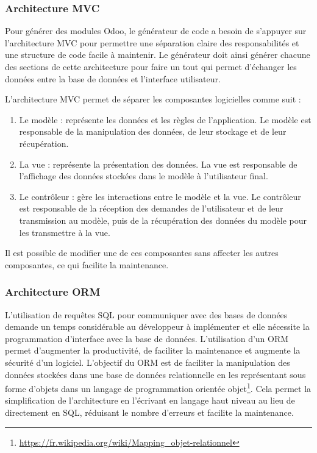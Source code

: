 
\subsubsection{Architecture MVC}

Pour générer des modules Odoo, le générateur de code a besoin de s'appuyer sur l'architecture MVC pour permettre une séparation claire des responsabilités et une structure de code facile à maintenir. Le générateur doit ainsi générer chacune des sections de cette architecture pour faire un tout qui permet d'échanger les données entre la base de données et l'interface utilisateur.

L’architecture MVC permet de séparer les composantes logicielles comme suit : 
\begin{enumerate}
    \item Le modèle : représente les données et les règles de l’application. Le modèle est responsable de la manipulation des données, de leur stockage et de leur récupération.
    \item La vue : représente la présentation des données. La vue est responsable de l’affichage des données stockées dans le modèle à l’utilisateur final.
    \item Le contrôleur : gère les interactions entre le modèle et la vue. Le contrôleur est responsable de la réception des demandes de l’utilisateur et de leur transmission au modèle, puis de la récupération des données du modèle pour les transmettre à la vue.
\end{enumerate}
Il est possible de modifier une de ces composantes sans affecter les autres composantes, ce qui facilite la maintenance.

\subsubsection{Architecture ORM}

L'utilisation de requêtes SQL pour communiquer avec des bases de données demande un temps considérable au développeur à implémenter et elle nécessite la programmation d'interface avec la base de données. L'utilisation d'un ORM permet d'augmenter la productivité, de faciliter la maintenance et augmente la sécurité d'un logiciel. L’objectif du ORM est de faciliter la manipulation des données stockées dans une base de données relationnelle en les représentant sous forme d’objets dans un langage de programmation orientée objet\footnote{\url{https://fr.wikipedia.org/wiki/Mapping_objet-relationnel}}. Cela permet la simplification de l’architecture en l’écrivant en langage haut niveau au lieu de directement en SQL, réduisant le nombre d'erreurs et facilite la maintenance.

